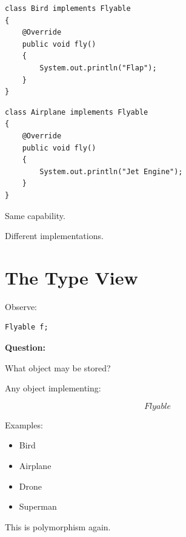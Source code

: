 \documentclass[11pt,a4paper]{book}
\begin{document}
\begin{verbatim}
class Bird implements Flyable
{
    @Override
    public void fly()
    {
        System.out.println("Flap");
    }
}
\end{verbatim}


\begin{verbatim}
class Airplane implements Flyable
{
    @Override
    public void fly()
    {
        System.out.println("Jet Engine");
    }
}
\end{verbatim}


Same capability.

Different implementations.


\section{The Type View}

Observe:

\begin{verbatim}
Flyable f;
\end{verbatim}


\textbf{Question:}

What object may be stored?


Any object implementing:

\[
Flyable
\]


Examples:

\begin{itemize}
\item Bird
\item Airplane
\item Drone
\item Superman
\end{itemize}


This is polymorphism again.

\end{document}
